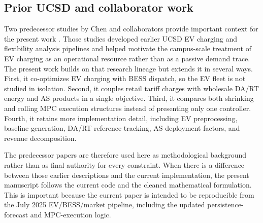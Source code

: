 \documentclass[final,5p,times]{elsarticle}
\begin{document}
\subsection{Prior UCSD and collaborator work}
Two predecessor studies by Chen and collaborators provide important context for the present work \cite{chen2024costoptimal,chen2026realtime}. Those studies developed earlier UCSD EV charging and flexibility analysis pipelines and helped motivate the campus-scale treatment of EV charging as an operational resource rather than as a passive demand trace. The present work builds on that research lineage but extends it in several ways. First, it co-optimizes EV charging with BESS dispatch, so the EV fleet is not studied in isolation. Second, it couples retail tariff charges with wholesale DA/RT energy and AS products in a single objective. Third, it compares both shrinking and rolling MPC execution structures instead of presenting only one controller. Fourth, it retains more implementation detail, including EV preprocessing, baseline generation, DA/RT reference tracking, AS deployment factors, and revenue decomposition.

The predecessor papers are therefore used here as methodological background rather than as final authority for every constraint. When there is a difference between those earlier descriptions and the current implementation, the present manuscript follows the current code and the cleaned mathematical formulation. This is important because the current paper is intended to be reproducible from the July 2025 EV/BESS/market pipeline, including the updated persistence-forecast and MPC-execution logic.
\end{document}
